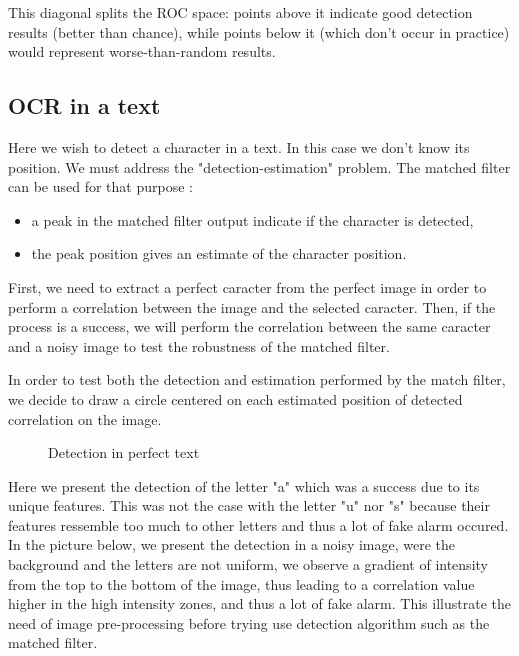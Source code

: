 This diagonal splits the ROC space: points above it indicate good detection results (better than chance), while points below it (which don't occur in practice) would represent worse-than-random results.





\subsection{OCR in a text}
Here we wish to detect a character in a text. In this case we don't know its position. We must address the "detection-estimation" problem. The matched filter can be used for that purpose :
\begin{itemize}
    \item a peak in the matched filter output indicate if the character is detected,
    \item the peak position gives an estimate of the character position.
\end{itemize}

First, we need to extract a perfect caracter from the perfect image in order to perform a correlation between the image and the selected caracter. Then, if the process is a success, we will perform the correlation between the same caracter and a noisy image to test the robustness of the matched filter.

In order to test both the detection and estimation performed by the match filter, we decide to draw a circle centered on each estimated position of detected correlation on the image.

\begin{figure}[h]
    \centering
	\caption{Detection in perfect text}
\end{figure}

Here we present the detection of the letter "a" which was a success due to its unique features. This was not the case with the letter "u" nor "s" because their features ressemble too much to other letters and thus a lot of fake alarm occured. In the picture below, we present the detection in a noisy image, were the background and the letters are not uniform, we observe a gradient of intensity from the top to the bottom of the image, thus leading to a correlation value higher in the high intensity zones, and thus a lot of fake alarm. This illustrate the need of image pre-processing before trying use detection algorithm such as the matched filter.

